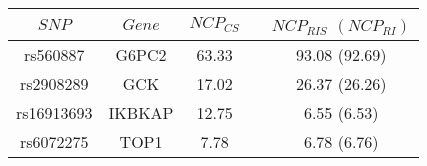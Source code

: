\begin{table}[ht]
\centering
\begin{tabular}{ccccc}
  \hline
$SNP$ & $Gene$ & $NCP_{CS}$ &  & $NCP_{RIS}$ $(NCP_{RI})$ \\ 
  \hline
rs560887 & G6PC2 & 63.33 & {\LARGE { }} & 93.08 (92.69) \\ 
  rs2908289 & GCK & 17.02 & {\LARGE { }} & 26.37 (26.26) \\ 
  rs16913693 & IKBKAP & 12.75 & {\LARGE { }} & 6.55 (6.53) \\ 
  rs6072275 & TOP1 & 7.78 & {\LARGE { }} & 6.78 (6.76) \\ 
   \hline
\end{tabular}
\label{tab:NCP0}
\end{table}
